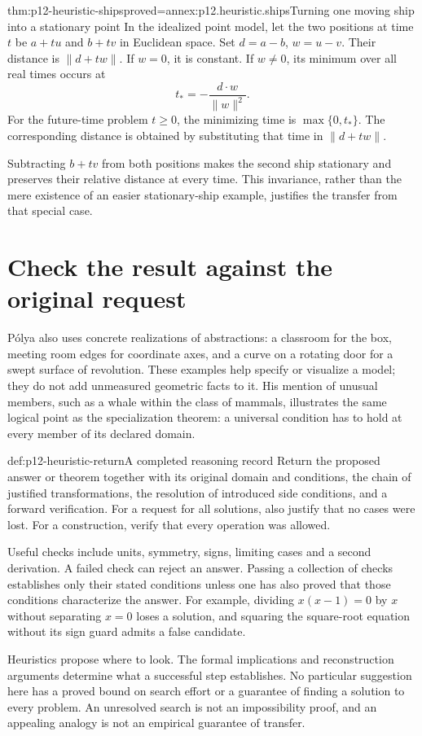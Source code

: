 \begin{hbtheorem}{thm:p12-heuristic-ships}{proved=annex:p12.heuristic.ships}{Turning one moving ship into a stationary point}
In the idealized point model, let the two positions at time \(t\)
be \(a+tu\) and \(b+tv\) in Euclidean space. Set
\(d=a-b\), \(w=u-v\). Their distance is \(\|d+tw\|\).
If \(w=0\), it is constant. If \(w\ne0\), its minimum over
all real times occurs at
\[
                   t_*=-\frac{d\cdot w}{\|w\|^2}.
\]
For the future-time problem \(t\ge0\), the minimizing time is
\(\max\{0,t_*\}\). The corresponding distance is obtained by
substituting that time in \(\|d+tw\|\).

Subtracting \(b+tv\) from both positions makes the second ship
stationary and preserves their relative distance at every time.
This invariance, rather than the mere existence of an easier
stationary-ship example, justifies the transfer from that special case.
\end{hbtheorem}

\section{Check the result against the original request}

P\'olya also uses concrete realizations of abstractions: a classroom
for the box, meeting room edges for coordinate axes, and a curve on
a rotating door for a swept surface of revolution. These examples
help specify or visualize a model; they do not add unmeasured
geometric facts to it. His mention of unusual members, such as a
whale within the class of mammals, illustrates the same logical
point as the specialization theorem: a universal condition has to
hold at every member of its declared domain.

\begin{hbmethod}{def:p12-heuristic-return}{A completed reasoning record}
Return the proposed answer or theorem together with its original
domain and conditions, the chain of justified transformations, the
resolution of introduced side conditions, and a forward verification.
For a request for all solutions, also justify that no cases were lost.
For a construction, verify that every operation was allowed.

Useful checks include units, symmetry, signs, limiting cases and a
second derivation. A failed check can reject an answer. Passing a
collection of checks establishes only their stated conditions unless
one has also proved that those conditions characterize the answer.
For example, dividing \(x(x-1)=0\) by \(x\) without separating
\(x=0\) loses a solution, and squaring the square-root equation
without its sign guard admits a false candidate.

Heuristics propose where to look. The formal implications and
reconstruction arguments determine what a successful step establishes.
No particular suggestion here has a proved bound on search effort
or a guarantee of finding a solution to every problem. An unresolved
search is not an impossibility proof, and an appealing analogy is not
an empirical guarantee of transfer.
\end{hbmethod}
